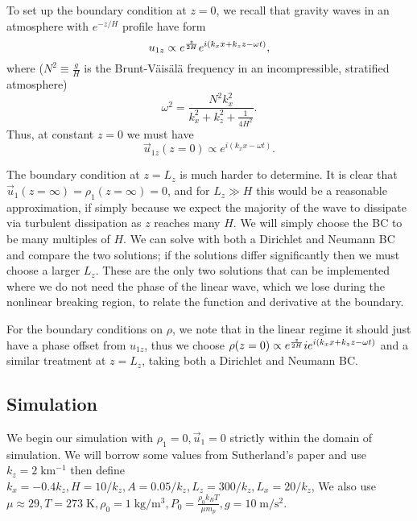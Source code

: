 \documentclass[11pt,
        usenames, %
        dvipsnames %
    ]{report}
\DeclarePairedDelimiter\p{\lparen}{\rparen}
\begin{document}
To set up the boundary condition at $z = 0$, we recall that gravity waves in an
atmosphere with $e^{-z/H}$ profile have form
\begin{equation}
    u_{1z} \propto e^{\frac{z}{2H}}e^{i\p*{k_xx + k_zz - \omega t}},
        \label{eq:bc_below}
\end{equation}
where ($N^2 \equiv \frac{g}{H}$ is the Brunt-V\"ais\"al\"a frequency in an
incompressible, stratified atmosphere)
\begin{equation}
    \omega^2 = \frac{N^2 k_x^2}{k_x^2 + k_z^2 + \frac{1}{4H^2}}.
        \label{eq:omega}
\end{equation}
Thus, at constant $z = 0$ we must have
\begin{equation}
    \vec{u}_{1z}(z = 0) \propto e^{i(k_xx - \omega t)}\label{eq:bc_u1z}.
\end{equation}

The boundary condition at $z = L_z$ is much harder to determine. It is clear
that $\vec{u}_1(z = \infty) = \rho_1(z = \infty) = 0$, and for $L_z \gg H$ this
would be a reasonable approximation, if simply because we expect the majority of
the wave to dissipate via turbulent dissipation as $z$ reaches many $H$. We will
simply choose the BC to be many multiples of $H$. We can solve with both a
Dirichlet and Neumann BC and compare the two solutions; if the solutions
differ significantly then we must choose a larger $L_z$. These are the only two
solutions that can be implemented where we do not need the phase of the linear
wave, which we lose during the nonlinear breaking region, to relate the function
and derivative at the boundary.

For the boundary conditions on $\rho$, we note that in the linear regime it
should just have a phase offset from $u_{1z}$, thus we choose $\rho(z = 0)
\propto e^{\frac{z}{2H}}ie^{i\p*{k_xx + k_zz - \omega t}}$ and a similar
treatment at $z = L_z$, taking both a Dirichlet and Neumann BC\@.

\subsection{Simulation}

We begin our simulation with $\rho_1 = 0, \vec{u}_1 = 0$ strictly within the
domain of simulation. We will borrow some values from Sutherland's paper and use
$k_z = 2\;\mathrm{km^{-1}}$ then define $k_x = -0.4k_z, H = 10 / k_z, A = 0.05 /
k_z, L_z = 300 / k_z, L_x = 20 / k_z$, We also use $\mu \approx 29, T =
273\;\mathrm{K}, \rho_0 = 1\;\mathrm{kg/m^3}, P_0 = \frac{\rho_0 k_BT}{\mu m_p},
g = 10\;\mathrm{m/s^2}$.
\end{document}
